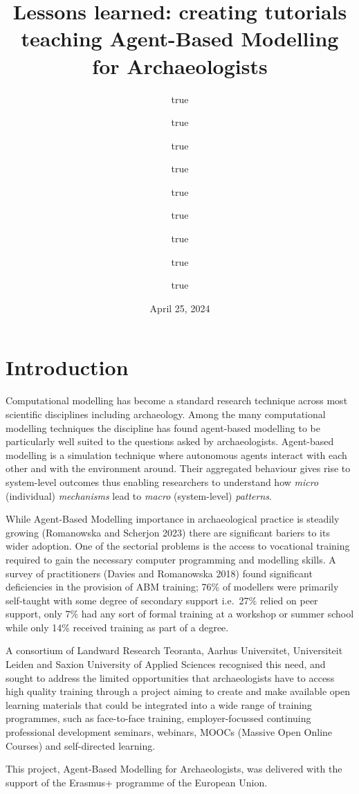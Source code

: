 \documentclass[
]{article}
\title{Lessons learned: creating tutorials teaching Agent-Based Modelling for Archaeologists}
\author{true \and true \and true \and true \and true \and true \and true \and true \and true}
\date{April 25, 2024}
\begin{document}
\maketitle

{
\setcounter{tocdepth}{2}
\tableofcontents
}
\hypertarget{introduction}{%
\section{Introduction}\label{introduction}}

Computational modelling has become a standard research technique across most scientific disciplines including archaeology. Among the many computational modelling techniques the discipline has found agent-based modelling to be particularly well suited to the questions asked by archaeologists. Agent-based modelling is a simulation technique where autonomous agents interact with each other and with the environment around. Their aggregated behaviour gives rise to system-level outcomes thus enabling researchers to understand how \emph{micro} (individual) \emph{mechanisms} lead to \emph{macro} (system-level) \emph{patterns}.

While Agent-Based Modelling importance in archaeological practice is steadily growing (Romanowska and Scherjon 2023) there are significant bariers to its wider adoption. One of the sectorial problems is the access to vocational training required to gain the necessary computer programming and modelling skills. A survey of practitioners (Davies and Romanowska 2018) found significant deficiencies in the provision of ABM training; 76\% of modellers were primarily self-taught with some degree of secondary support i.e.~27\% relied on peer support, only 7\% had any sort of formal training at a workshop or summer school while only 14\% received training as part of a degree.

A consortium of Landward Research Teoranta, Aarhus Universitet, Universiteit Leiden and Saxion University of Applied Sciences recognised this need, and sought to address the limited opportunities that archaeologists have to access high quality training through a project aiming to create and make available open learning materials that could be integrated into a wide range of training programmes, such as face-to-face training, employer-focussed continuing professional development seminars, webinars, MOOCs (Massive Open Online Courses) and self-directed learning.

This project, Agent-Based Modelling for Archaeologists, was delivered with the support of the Erasmus+ programme of the European Union.
\end{document}
